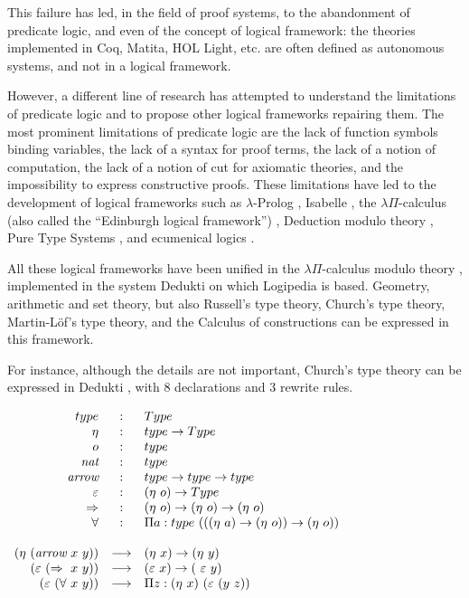This failure has led, in the field of proof systems, to the
abandonment of predicate logic, and even of the concept of logical
framework: the theories implemented in Coq, Matita, HOL Light,
etc. are often defined as autonomous systems, and not in a logical
framework.

However, a different line of research has attempted to understand the
limitations of predicate logic and to propose other logical frameworks
repairing them. The most prominent limitations of predicate logic are
the lack of function symbols binding variables, the lack of a syntax
for proof terms, the lack of a notion of computation, the lack of a
notion of cut for axiomatic theories, and the impossibility to express
constructive proofs. These limitations have led to the development of
logical frameworks such as $\lambda$-Prolog \cite{NadathurMiller88,
  MillerNadathur12}, Isabelle \cite{Paulson90}, the $\lambda
\Pi$-calculus (also called the ``Edinburgh logical framework'')
\cite{HarperHonsellPlotkin91}, Deduction modulo theory
\cite{DowekHardinKirchner03, DowekWerner03}, Pure Type Systems
\cite{Berardi88,Terlouw89}, and ecumenical logics
\cite{Prawitz15,Dowek15,PereiraRodriguez17}.

All these logical frameworks have been unified in the $\lambda
\Pi$-calculus modulo theory \cite{CousineauDowek07}, implemented in
the system Dedukti \cite{Assaf16}
on which Logipedia is based. Geometry, arithmetic and set
theory, but also Russell's type theory, Church's type theory,
Martin-L\"of's type theory, and the Calculus of constructions can be
expressed in this framework.

For instance, although the details are not important, Church's type
theory can be expressed in Dedukti , with 8 declarations and 3
rewrite rules.
\begin{framed}
$\begin{array}{rcl}
type&:&Type\\
\eta&:&type \rightarrow Type\\
o&:&type\\
\mbox{\it nat}&:&type\\
\mbox{\it arrow}&:&type \rightarrow type \rightarrow type\\
\varepsilon&:&(\eta~o) \rightarrow Type\\
\Rightarrow&:&(\eta~o) \rightarrow (\eta~o) \rightarrow (\eta~o)\\
\forall&:&\Pi a:type~(((\eta~a) \rightarrow (\eta~o)) \rightarrow (\eta~o))\\
\\
(\eta~(\mbox{\it arrow}~x~y)) &\longrightarrow& (\eta~x) \rightarrow (\eta~y)\\
(\varepsilon~(\Rightarrow~x~y)) &\longrightarrow& (\varepsilon~x) \rightarrow (\
\varepsilon~y)\\
(\varepsilon~(\forall~x~y)) &\longrightarrow& \Pi z:(\eta~x)~(\varepsilon~(y~z))
\end{array}$
\end{framed}


